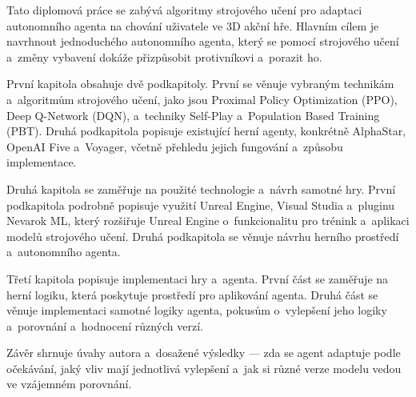 Tato diplomová práce se zabývá algoritmy strojového učení pro adaptaci autonomního agenta na chování uživatele ve 3D akční hře. Hlavním cílem je navrhnout jednoduchého autonomního agenta, který se pomocí strojového učení a~změny vybavení dokáže přizpůsobit protivníkovi a~porazit ho.

První kapitola obsahuje dvě podkapitoly. První se věnuje vybraným technikám a~algoritmům strojového učení, jako jsou Proximal Policy Optimization (PPO), Deep Q-Network (DQN), a~techniky Self-Play a~Population Based Training (PBT). Druhá podkapitola popisuje existující herní agenty, konkrétně AlphaStar, OpenAI Five a~Voyager, včetně přehledu jejich fungování a~způsobu implementace.

Druhá kapitola se zaměřuje na použité technologie a~návrh samotné hry. První podkapitola podrobně popisuje využití Unreal Engine, Visual Studia a~pluginu Nevarok ML, který rozšiřuje Unreal Engine o~funkcionalitu pro trénink a~aplikaci modelů strojového učení. Druhá podkapitola se věnuje návrhu herního prostředí a~autonomního agenta.

Třetí kapitola popisuje implementaci hry a~agenta. První část se zaměřuje na herní logiku, která poskytuje prostředí pro aplikování agenta. Druhá část se věnuje implementaci samotné logiky agenta, pokusům o~vylepšení jeho logiky a~porovnání a~hodnocení různých verzí.

Závěr shrnuje úvahy autora a~dosažené výsledky — zda se agent adaptuje podle očekávání, jaký vliv mají jednotlivá vylepšení a~jak si různé verze modelu vedou ve vzájemném porovnání.